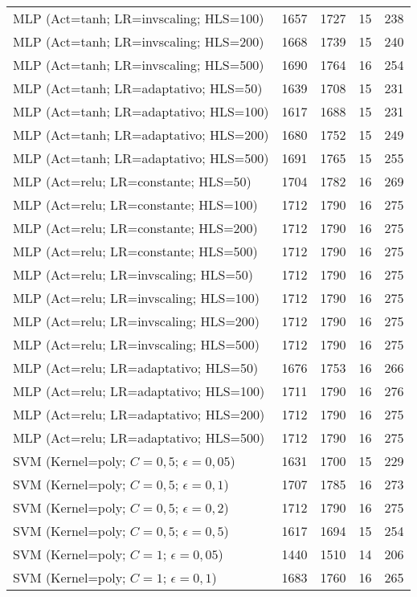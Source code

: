 \begin{center}
\begin{longtable}{|l|l|l|l|l|}
MLP (Act=tanh; LR=invscaling; HLS=100) & 1657 & 1727 & 15 & 238 \\
MLP (Act=tanh; LR=invscaling; HLS=200) & 1668 & 1739 & 15 & 240 \\
MLP (Act=tanh; LR=invscaling; HLS=500) & 1690 & 1764 & 16 & 254 \\
MLP (Act=tanh; LR=adaptativo; HLS=50) & 1639 & 1708 & 15 & 231 \\
MLP (Act=tanh; LR=adaptativo; HLS=100) & 1617 & 1688 & 15 & 231 \\
MLP (Act=tanh; LR=adaptativo; HLS=200) & 1680 & 1752 & 15 & 249 \\
MLP (Act=tanh; LR=adaptativo; HLS=500) & 1691 & 1765 & 15 & 255 \\
MLP (Act=relu; LR=constante; HLS=50) & 1704 & 1782 & 16 & 269 \\
MLP (Act=relu; LR=constante; HLS=100) & 1712 & 1790 & 16 & 275 \\
MLP (Act=relu; LR=constante; HLS=200) & 1712 & 1790 & 16 & 275 \\
MLP (Act=relu; LR=constante; HLS=500) & 1712 & 1790 & 16 & 275 \\
MLP (Act=relu; LR=invscaling; HLS=50) & 1712 & 1790 & 16 & 275 \\
MLP (Act=relu; LR=invscaling; HLS=100) & 1712 & 1790 & 16 & 275 \\
MLP (Act=relu; LR=invscaling; HLS=200) & 1712 & 1790 & 16 & 275 \\
MLP (Act=relu; LR=invscaling; HLS=500) & 1712 & 1790 & 16 & 275 \\
MLP (Act=relu; LR=adaptativo; HLS=50) & 1676 & 1753 & 16 & 266 \\
MLP (Act=relu; LR=adaptativo; HLS=100) & 1711 & 1790 & 16 & 276 \\
MLP (Act=relu; LR=adaptativo; HLS=200) & 1712 & 1790 & 16 & 275 \\
MLP (Act=relu; LR=adaptativo; HLS=500) & 1712 & 1790 & 16 & 275 \\
SVM (Kernel=poly; $C=0,5$; $\epsilon=0,05$) & 1631 & 1700 & 15 & 229 \\
SVM (Kernel=poly; $C=0,5$; $\epsilon=0,1$) & 1707 & 1785 & 16 & 273 \\
SVM (Kernel=poly; $C=0,5$; $\epsilon=0,2$) & 1712 & 1790 & 16 & 275 \\
SVM (Kernel=poly; $C=0,5$; $\epsilon=0,5$) & 1617 & 1694 & 15 & 254 \\
SVM (Kernel=poly; $C=1$; $\epsilon=0,05$) & 1440 & 1510 & 14 & 206 \\
SVM (Kernel=poly; $C=1$; $\epsilon=0,1$) & 1683 & 1760 & 16 & 265 \\

\end{longtable}
\end{center}
